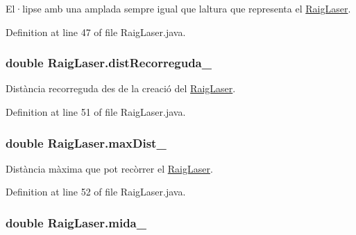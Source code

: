 El·lipse amb una amplada sempre igual que l\textquotesingle{}altura que representa el \hyperlink{class_raig_laser}{Raig\+Laser}. 



Definition at line 47 of file Raig\+Laser.\+java.

\hypertarget{class_raig_laser_aecdc87070f24e6116db8f89d61d75b3a}{}
\subsubsection[{dist\+Recorreguda\+\_\+}]{\setlength{\rightskip}{0pt plus 5cm}double Raig\+Laser.\+dist\+Recorreguda\+\_\+\hspace{0.3cm}{\ttfamily [private]}}\label{class_raig_laser_aecdc87070f24e6116db8f89d61d75b3a}


Distància recorreguda des de la creació del \hyperlink{class_raig_laser}{Raig\+Laser}. 



Definition at line 51 of file Raig\+Laser.\+java.

\hypertarget{class_raig_laser_a950579f9b8aec21d629287044a7a65e7}{}
\subsubsection[{max\+Dist\+\_\+}]{\setlength{\rightskip}{0pt plus 5cm}double Raig\+Laser.\+max\+Dist\+\_\+\hspace{0.3cm}{\ttfamily [private]}}\label{class_raig_laser_a950579f9b8aec21d629287044a7a65e7}


Distància màxima que pot recòrrer el \hyperlink{class_raig_laser}{Raig\+Laser}. 



Definition at line 52 of file Raig\+Laser.\+java.

\hypertarget{class_raig_laser_ac18a272d02d6d090eebee561f05c1a0a}{}
\subsubsection[{mida\+\_\+}]{\setlength{\rightskip}{0pt plus 5cm}double Raig\+Laser.\+mida\+\_\+\hspace{0.3cm}{\ttfamily [private]}}\label{class_raig_laser_ac18a272d02d6d090eebee561f05c1a0a}


